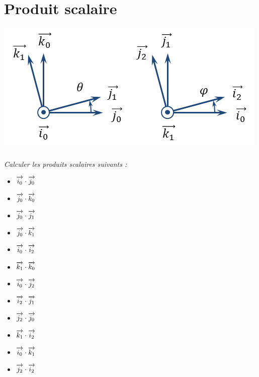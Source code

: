 \documentclass[10pt]{article}
\begin{document}






%
%

\section*{Produit scalaire}

\begin{center}
\includegraphics[width=.4\textwidth]{images/FiguresPlanes}
\end{center}

\subparagraph*{}\textit{Calculer les produits scalaires suivants :}

\begin{multicols}{3}
\begin{itemize}
 \renewcommand{\labelitemi}{\tiny{$\blacksquare$}}
\item $\overrightarrow{i_0} \cdot \overrightarrow{j_0}$
\item $\overrightarrow{j_0} \cdot \overrightarrow{k_0}$
\item $\overrightarrow{j_0} \cdot \overrightarrow{j_1}$
\item $\overrightarrow{j_0} \cdot \overrightarrow{k_1}$
\item $\overrightarrow{i_0} \cdot \overrightarrow{i_2}$
\item $\overrightarrow{k_1} \cdot \overrightarrow{k_0}$
\item $\overrightarrow{i_0} \cdot \overrightarrow{j_2}$
\item $\overrightarrow{i_2} \cdot \overrightarrow{j_1}$
\item $\overrightarrow{j_2} \cdot \overrightarrow{j_0}$
\item $\overrightarrow{k_1} \cdot \overrightarrow{i_2}$
\item $\overrightarrow{i_0} \cdot \overrightarrow{k_1}$
\item $\overrightarrow{j_2} \cdot \overrightarrow{i_2}$
\end{itemize}
\end{multicols}
\end{document}
